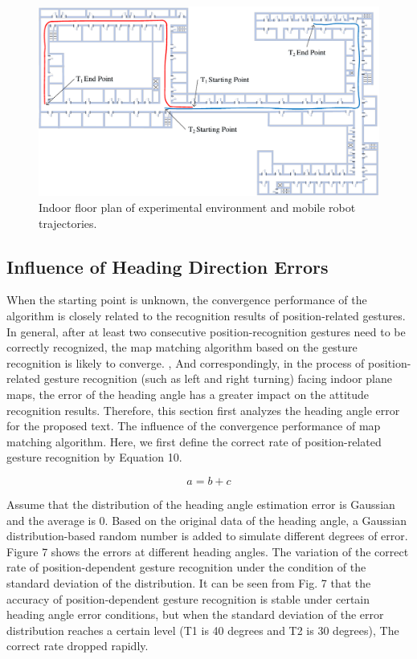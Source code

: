 \documentclass{llncs}
\begin{document}
\begin{figure}[!htbp]
	\centering
	\includegraphics[width=4.976in]{RobotMatch-Environment}
	\caption{Indoor floor plan of experimental environment and mobile robot trajectories.}
	\label{fig-environment}
\end{figure}

\subsection{Influence of Heading Direction Errors}

When the starting point is unknown, the convergence performance of the algorithm is closely related to the recognition results of position-related gestures. In general, after at least two consecutive position-recognition gestures need to be correctly recognized, the map matching algorithm based on the gesture recognition is likely to converge. , And correspondingly, in the process of position-related gesture recognition (such as left and right turning) facing indoor plane maps, the error of the heading angle has a greater impact on the attitude recognition results. Therefore, this section first analyzes the heading angle error for the proposed text. The influence of the convergence performance of map matching algorithm. Here, we first define the correct rate of position-related gesture recognition by Equation 10.

\begin{equation}
	a = b + c
\end{equation}

Assume that the distribution of the heading angle estimation error is Gaussian and the average is 0. Based on the original data of the heading angle, a Gaussian distribution-based random number is added to simulate different degrees of error. Figure 7 shows the errors at different heading angles. The variation of the correct rate of position-dependent gesture recognition under the condition of the standard deviation of the distribution. It can be seen from Fig. 7 that the accuracy of position-dependent gesture recognition is stable under certain heading angle error conditions, but when the standard deviation of the error distribution reaches a certain level (T1 is 40 degrees and T2 is 30 degrees), The correct rate dropped rapidly.
\end{document}
